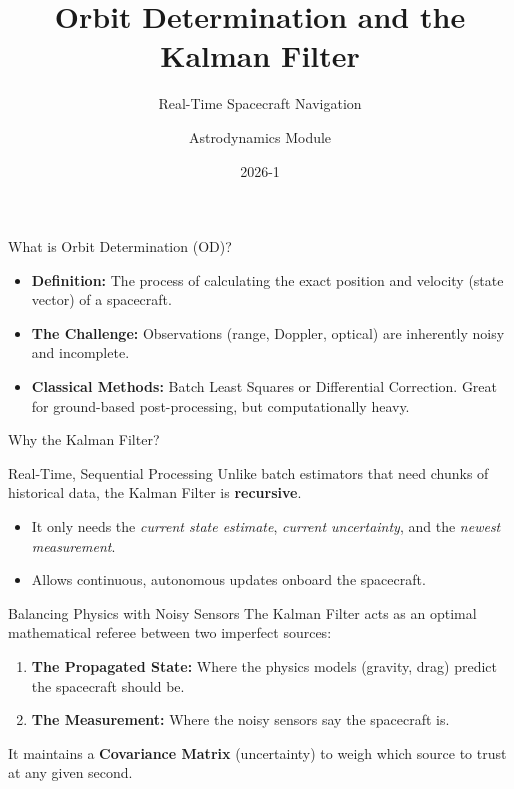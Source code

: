 \documentclass{beamer}
\title[Orbit Determination \& KF]{Orbit Determination and the Kalman Filter}
\subtitle{Real-Time Spacecraft Navigation}
\author{Astrodynamics Module}
\institute[UdeA]{Universidad de Antioquia}
\date{2026-1}
\begin{document}
\begin{frame}
    \titlepage
\end{frame}

\begin{frame}{What is Orbit Determination (OD)?}
    \begin{itemize}
        \item \textbf{Definition:} The process of calculating the exact position and velocity (state vector) of a spacecraft.
        \item \textbf{The Challenge:} Observations (range, Doppler, optical) are inherently noisy and incomplete.
        \item \textbf{Classical Methods:} Batch Least Squares or Differential Correction. Great for ground-based post-processing, but computationally heavy.
    \end{itemize}
\end{frame}

\begin{frame}{Why the Kalman Filter?}
    \begin{block}{Real-Time, Sequential Processing}
        Unlike batch estimators that need chunks of historical data, the Kalman Filter is \textbf{recursive}.
    \end{block}
    \vspace{0.5cm}
    \begin{itemize}
        \item It only needs the \textit{current state estimate}, \textit{current uncertainty}, and the \textit{newest measurement}.
        \item Allows continuous, autonomous updates onboard the spacecraft.
    \end{itemize}
\end{frame}

\begin{frame}{Balancing Physics with Noisy Sensors}
    The Kalman Filter acts as an optimal mathematical referee between two imperfect sources:
    \vspace{0.3cm}
    \begin{enumerate}
        \item \textbf{The Propagated State:} Where the physics models (gravity, drag) predict the spacecraft should be.
        \item \textbf{The Measurement:} Where the noisy sensors say the spacecraft is.
    \end{enumerate}
    \vspace{0.3cm}
    It maintains a \textbf{Covariance Matrix} (uncertainty) to weigh which source to trust at any given second.
\end{frame}
\end{document}
